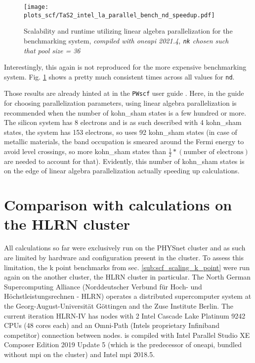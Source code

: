 \documentclass[main.tex]{subfiles}
\begin{document}
\begin{figure}[ht!]
    \centering
    \texttt{[image: plots\_scf/TaS2\_intel\_la\_parallel\_bench\_nd\_speedup.pdf]}
    \label{fig:scaling_scf_nd_tas2}
    \caption{Scalability and runtime utilizing linear algebra parallelization for the \TaS benchmarking system, \emph{\QE compiled with \gls{oneapi} 2021.4, \texttt{nk} chosen such that pool size = 36}}
\end{figure}
Interestingly, this again is not reproduced for the more expensive \TaS benchmarking system.
Fig. \ref{fig:scaling_scf_nd_tas2} shows a pretty much consistent times across all values for \texttt{nd}.

Those results are already hinted at in the \texttt{PWscf} user guide \cite{noauthor_pwscf_nodate}.
Here, in the guide for choosing parallelization parameters, using linear algebra parallelization is recommended when the number of \acrshort{kohn_sham} states is a few hundred or more.
The silicon system has 8 electrons and is as such described with 4 \gls{kohn_sham} states, the \TaS system has 153 electrons, so \QE uses 92 \gls{kohn_sham} states (in case of metallic materials, the band occupation is smeared around the Fermi energy to avoid level crossings, so more \gls{kohn_sham} states than \(\frac{1}{2} * (\textrm{number of electrons})\) are needed to account for that).
Evidently, this number of \acrshort{kohn_sham} states is on the edge of linear algebra parallelization actually speeding up calculations.

\section{Comparison with calculations on the HLRN cluster}

All calculations so far were exclusively run on the PHYSnet cluster and as such are limited by hardware and configuration present in the cluster.
To assess this limitation, the k point benchmarks from sec. \ref{sub:scf_scaling_k_point} were run again on the another cluster, the HLRN cluster in particular.
The North German Supercomputing Alliance (Norddeutscher Verbund für Hoch- und Höchstleistungsrechnen - HLRN) operates a distributed supercomputer system at the Georg-August-Universität Göttingen and the Zuse Institute Berlin.
The current iteration HLRN-IV has nodes with 2 Intel Cascade Lake Platinum 9242 CPUs (48 cores each) and an Omni-Path (Intels proprietary Infiniband competitor) connection between nodes.
\QE is compiled with Intel Parallel Studio XE Composer Edition 2019 Update 5 (which is the predecessor of \gls{oneapi}, bundled without \gls{mpi} on the cluster) and Intel \gls{mpi} 2018.5.
\end{document}
